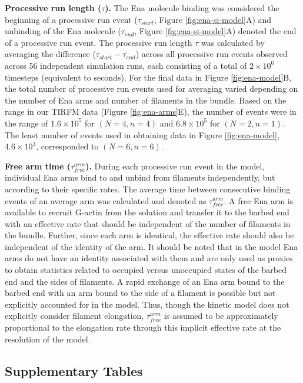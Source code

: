 \textbf{Processive run length ($\tau$).} The Ena molecule binding was considered the beginning of a processive run event ($\tau_{start}$, Figure \ref{fig:ena-si-model}A) and unbinding of the Ena molecule ($\tau_{end}$, Figure \ref{fig:ena-si-model}A) denoted the end of a processive run event. The processive run length $\tau$ was calculated by averaging the difference ($\tau_{start}-\tau_{end}$) across all processive run events observed across 56 independent simulation runs, each consisting of a total of $2\times 10^{6}$ timesteps (equivalent to  seconds).  
For the final data in Figure \ref{fig:ena-model}B, the total number of processive run events used for averaging varied depending on the number of Ena arms and number of filaments in the bundle. Based on the range in our TIRFM data (Figure \ref{fig:ena-arms}E), the number of events were in the range of \mytilde$1.6 \times 10^{5}$ for $(N=4, n=4)$ and $6.8 \times 10^{5}$ for $(N=2, n=1)$. The least number of events used in obtaining data in Figure \ref{fig:ena-model}, \mytilde$4.6 \times 10^{3}$, corresponded to $(N=6, n=6)$.

\textbf{Free arm time ($\tau_{free}^{arm}$).} During each processive run event in the model, individual Ena arms bind to and unbind from filaments independently, but according to their specific rates. The average time between consecutive binding events of an average arm was calculated and denoted as $\tau_{free}^{arm}$. A free Ena arm is available to recruit G-actin from the solution and transfer it to the barbed end with an effective rate that should be independent of the number of filaments in the bundle. Further, since each arm is identical, the effective rate should also be independent of the identity of the arm. It should be noted that in the model Ena arms do not have an identity associated with them and are only used as proxies to obtain statistics related to occupied versus unoccupied states of the barbed end and the sides of filaments. A rapid exchange of an Ena arm bound to the barbed end with an arm bound to the side of a filament is possible but not explicitly accounted for in the model. Thus, though the kinetic model does not explicitly consider filament elongation, $\tau_{free}^{arm}$ is assumed to be approximately proportional to the elongation rate through this implicit effective rate at the resolution of the model.

\clearpage
\subsection{Supplementary Tables}\label{ch02-supplementary-tables}

